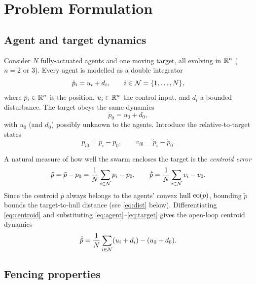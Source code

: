 \section{Problem Formulation}
\label{sec:problem}

\subsection{Agent and target dynamics}

Consider $N$ fully-actuated agents and one moving target, all evolving in
$\mathbb{R}^n$ ($n=2$ or $3$). Every agent is modelled as a double integrator
\begin{equation}
    \ddot p_i = u_i + d_i, \qquad i\in\mathcal{N}=\{1,\dots,N\},
    \label{eq:agent}
\end{equation}
where $p_i\in\mathbb{R}^n$ is the position, $u_i\in\mathbb{R}^n$ the control input, and
$d_i$ a bounded disturbance. The target obeys the same dynamics
\begin{equation}
    \ddot p_0 = u_0 + d_0,
    \label{eq:target}
\end{equation}
with $u_0$ (and $d_0$) possibly unknown to the agents. Introduce the
relative-to-target states
\[
p_{i0}=p_i-p_0,\qquad v_{i0}=\dot p_i-\dot p_0.
\]

A natural measure of how well the swarm encloses the target is the
\emph{centroid error}
\begin{equation}
    \tilde p = \bar p - p_0
    = \frac{1}{N}\sum_{i\in\mathcal{N}} p_i - p_0,
    \qquad \dot{\tilde p} = \frac{1}{N}\sum_{i\in\mathcal{N}} v_i - v_0.
    \label{eq:centroid}
\end{equation}
Since the centroid $\bar p$ always belongs to the agents' convex hull
$\mathrm{co}(p)$, bounding $\tilde p$ bounds the target-to-hull distance (see
\eqref{eq:dist} below). Differentiating \eqref{eq:centroid} and substituting
\eqref{eq:agent}--\eqref{eq:target} gives the open-loop centroid dynamics
\begin{equation}
    \ddot{\tilde p}
    = \frac{1}{N}\sum_{i\in\mathcal{N}}(u_i+d_i) - (u_0+d_0).
    \label{eq:centroid-dyn}
\end{equation}

\subsection{Fencing properties}

